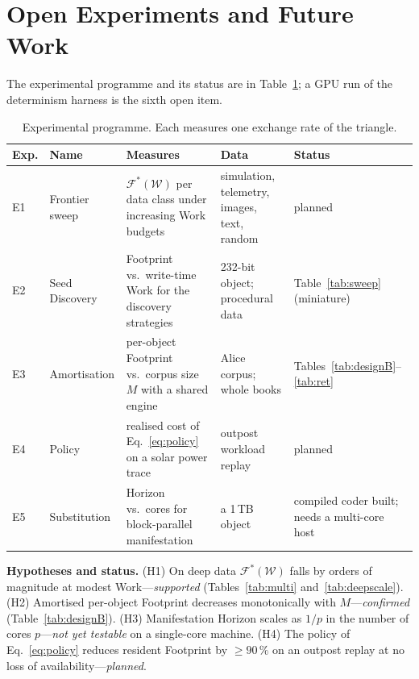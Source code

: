 \documentclass[11pt,a4paper]{article}
\theoremstyle{definition}
\theoremstyle{plain}
\theoremstyle{remark}
\newcommand{\Foot}{\mathcal{F}}
\newcommand{\Work}{\mathcal{W}}
\begin{document}
\section{Open Experiments and Future Work}
\label{sec:future}
The experimental programme and its status are in Table~\ref{tab:programme}; a GPU run of the
determinism harness is the sixth open item.

\begin{table}[!htb]
\centering\small
\caption{Experimental programme. Each measures one exchange rate of the triangle.}
\label{tab:programme}
\begin{tabular}{@{}llp{4.8cm}p{2.8cm}p{3.4cm}@{}}
\toprule
\textbf{Exp.} & \textbf{Name} & \textbf{Measures} & \textbf{Data} & \textbf{Status} \\
\midrule
E1 & Frontier sweep & $\Foot^{*}(\Work)$ per data class under increasing Work budgets & simulation, telemetry, images, text, random & planned \\
E2 & Seed Discovery & Footprint vs.\ write-time Work for the discovery strategies & 232-bit object; procedural data & Table~\ref{tab:sweep} (miniature) \\
E3 & Amortisation & per-object Footprint vs.\ corpus size $M$ with a shared engine & Alice corpus; whole books & Tables~\ref{tab:designB}--\ref{tab:ret} \\
E4 & Policy & realised cost of Eq.~\eqref{eq:policy} on a solar power trace & outpost workload replay & planned \\
E5 & Substitution & Horizon vs.\ cores for block-parallel manifestation & a 1\,TB object & compiled coder built; needs a multi-core host \\
\bottomrule
\end{tabular}
\end{table} \noindent\textbf{Hypotheses and status.} (H1) On deep data $\Foot^{*}(\Work)$ falls by orders of
magnitude at modest Work---\emph{supported} (Tables~\ref{tab:multi} and~\ref{tab:deepscale}).
(H2) Amortised per-object Footprint decreases monotonically with $M$---\emph{confirmed}
(Table~\ref{tab:designB}). (H3) Manifestation Horizon scales as $1/p$ in the number of cores
$p$---\emph{not yet testable} on a single-core machine. (H4) The policy of Eq.~\eqref{eq:policy}
reduces resident Footprint by $\ge90\,\%$ on an outpost replay at no loss of
availability---\emph{planned}.
\end{document}
